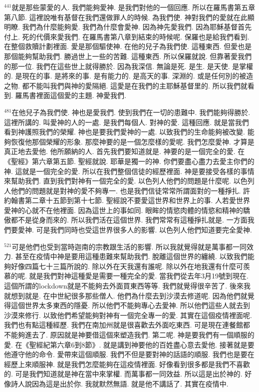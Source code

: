 \documentclass{book}
\begin{document}
$^{441}$就是那些蒙愛的人.
我們能夠愛神.
是我們對他的一個回應.
所以在羅馬書第五章第八節.
這裡說唯有基督在我們還做罪人的時候.
為我們使.
神對我們的愛就在此顯明瞭.
我們為什麼能夠愛.
我們為什麼會愛神.
因為神先愛我們.
因為耶穌基督首先付上.
死的代價來愛我們.
在羅馬書第八章到結束的時候呢.
保羅也是給我們看到.
在整個救贖計劃裡面.
愛是那個驅使神.
在他的兒子為我們使.
這種東西.
但愛也是那個能夠幫助我們.
勝過世上一些的苦難.
這種東西.
所以保羅就說.
但靠著愛我們的那一位.
我們在這些世上就得勝於.
因為我深信.
無論是死.
是生.
是天使.
是掌權的.
是現在的事.
是將來的事.
是有能力的.
是高天的事.
深淵的.
或是任何別的被造之物.
都不能叫我們與神的愛隔絕.
這愛是在我們的主耶穌基督里的.
所以我們就看到.
羅馬書裡面這個愛的主題.
神愛我們.

$^{481}$在他兒子為我們使.
神也是愛我們.
使到我們在一切的患難中.
我們能夠得勝於.
這裡所講的.
叫愛神的人的一處.
是我們每個人.
對神的愛.
這種回應.
就是當我們看到神護照我們的榮耀.
神也是要我們愛神的一處.
以致我們的生命能夠被改變.
能夠恢復他那個榮耀的形象.
那麼神要的是一個怎麼樣的愛呢.
我們怎麼愛神.
才算是真正地去愛他.
他所願納的人.
首先我們要知道就是.
神要的是一個完全的愛.
在《聖經》第六章第五節.
聖經就說.
耶華是獨一的神.
你們要盡心盡力去愛主你們的神.
這就是一個完全的愛.
所以在我們整個信徒的經歷裡面.
神是要接受各樣的事情來幫助我們.
直到我們對神有一個完全的愛.
以色列人他們的問題是什麼呢.
以色列人他們的問題就是對神的愛不夠專一.
也是我們信徒常常所謂面對的一種掙扎.
許約翰書第二章十五節到第十七節.
聖經說不要愛這世界和世界上的事.
人若愛世界愛神的心就不在他裡面.
因為這世上的事如同.
眼眸的情慾肉體的情慾和精神的驕傲都不是從身而來的.
所以我們活在這個世界.
我們常常有這種掙扎就是.
一方面我們要愛神.
可是我們同時也受這世界很多人的影響.
以色列人他們知道要完全愛神.

$^{521}$可是他們也受到當時迦南的宗教跟生活的影響.
所以我就覺得就是萬事都一同效力.
甚至在疫情中神是要用這種患難來幫助我們.
脫離這個世界的纏繞.
以致我們能夠好像四篇七十三篇所說的.
除以外在天我還有誰呢.
除以外在地我還有什麼可羨慕的呢.
就是我們對神這種愛是需要一種完全的愛.
當我們從去年3月19號到現在.
這個所謂的lockdown就是不能夠去外面買東西等等.
我們就覺得很辛苦了.
後來我就想到就是.
在中世紀很多那些僧人.
他們為什麼去到沙漠去修道呢.
因為他們就覺得這個世界太多東西的隱憂.
所以他們不能夠專心去愛神.
所以他們這些人就去到沙漠來修行.
以致他們希望能夠對神有一個完全專一的愛.
其實在這個疫情裡面呢.
我們也有點這種經歷.
我們在南加州就是很喜歡去外面吃東西.
可是現在連餐館都不能夠進去了.
原因就是神要借這個來塑造我們.
第二呢.
神是要我們有一個順服的愛.
在《聖經紀第六章6到8節》.
就是講到神要他的百姓盡心意去愛他.
接著就是要他遵守他的命令.
愛帶來這個順服.
我們不但是要對神的話語的順服.
我們也是要在經歷上來順服神.
就是我們怎麼能夠在這疫情裡面.
好像看到很多都是我們不喜歡的.
可是我們知道就是神在當中來掌權.
而萬事都一同效益.
所以這是出於神的.
好像詩人說因為這是出於你.
我就默然無語.
就是他不講話了.
其實在疫情中.
\end{document}
